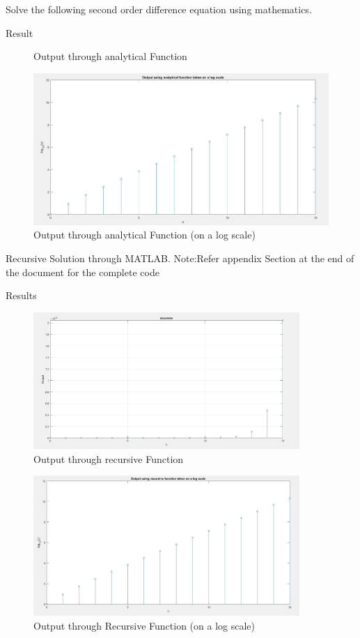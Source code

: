 \documentclass[12pt, letterpaper]{article}
\begin{document}
\begin{section}{Solve the following second order difference equation using mathematics.}
\begin{subsection}{Result}
\begin{figure}[!htp]
\caption{Output through analytical Function}
\end{figure}
\begin{figure}[!htp]
\includegraphics[width=1\textwidth]{fig6.jpg}
\caption{Output through analytical Function (on a log scale)}
\end{figure}

\end{subsection}

\end{section}
\begin{section}{Recursive Solution through MATLAB.}
Note:Refer appendix Section at the end of the document for the complete code

\begin{subsection}{Results}
\begin{figure}[!htp]
\includegraphics[width=0.9\textwidth]{fig4.jpg}
\caption{Output through recursive Function}
\end{figure}
\begin{figure}[!htp]
\includegraphics[width=0.9\textwidth]{fig7.jpg}
\caption{Output through Recursive Function (on a log scale)}
\end{figure}
\end{subsection} 
\end{section}
\end{document}
